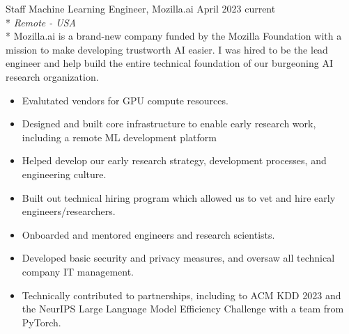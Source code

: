 \documentclass[print]{friggeri-cv} %
\begin{document}
\begin{description} \itemsep1pt \parskip0pt 
  \item {\largeheaderfont Staff Machine Learning Engineer, Mozilla.ai}
    \hfill {\smallheaderfont April 2023 \textemdash current}\\*
    {\footnotesize \emph{Remote - USA}}\\*
    Mozilla.ai is a brand-new company funded by the Mozilla Foundation with a
    mission to make developing trustworth AI easier. I was hired to be the lead
    engineer and help build the entire technical foundation of our burgeoning AI research organization.
    
    \begin{itemize} \itemsep0.5pt \parskip0pt 
      \item Evalutated vendors for GPU compute resources.
      \item Designed and built core infrastructure to enable early research work, including a remote ML development platform
      \item Helped develop our early research strategy, development processes, and engineering culture.
      \item Built out technical hiring program which allowed us to vet and hire early engineers/researchers.
      \item Onboarded and mentored engineers and research scientists.
      \item Developed basic security and privacy measures, and oversaw all technical company IT management.
      \item Technically contributed to partnerships, including to ACM KDD 2023\autocite{kdd_2023_workshop} and the NeurIPS Large Language Model Efficiency Challenge\autocite{neurips_llm_efficiency_2023}
      with a team from PyTorch.
    \end{itemize}
  \end{description}
\end{document}
